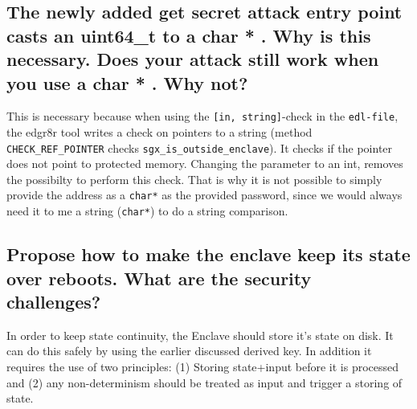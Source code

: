 \documentclass{article}
\begin{document}
\subsection{The newly added
  get
  secret
  attack
  entry point casts an
  uint64\_t
  to
  a
  char *
  .  Why is this necessary.  Does your attack still work when you
  use a
  char *
  .  Why not?  }

  This is necessary because when using the \texttt{[in, string]}-check in the
  \texttt{edl-file}, the edgr8r tool writes a check on
  pointers to a string (method \texttt{CHECK\_REF\_POINTER} checks
    \texttt{sgx\_is\_outside\_enclave}). It checks if the pointer does not point to protected
  memory. Changing the parameter to an int, removes the possibilty to perform
  this check. That is why it is not
  possible to simply provide the address as a \texttt{char*} as the provided
  password, since we would always need it to me a string (\texttt{char*}) to do
  a string comparison.

\subsection{Propose how to make the enclave keep its state over reboots.  What are
the security challenges?}

In order to keep state continuity, the Enclave should store it's
state on disk. It can do this safely by using the earlier discussed derived key.
In addition it requires the use of two principles: (1) Storing state+input before it
is processed and (2) any non-determinism should be treated as input and trigger
a storing of state.
\end{document}
